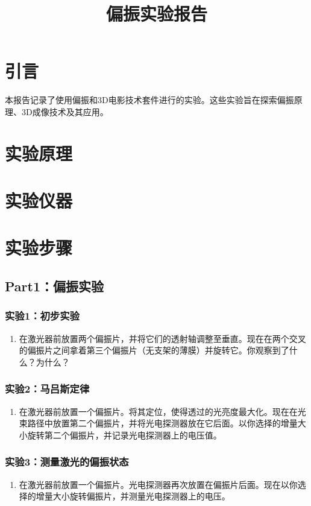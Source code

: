 \documentclass{ctexart}
\title{偏振实验报告}
\begin{document}
\maketitle

\section{引言}
本报告记录了使用偏振和3D电影技术套件进行的实验。这些实验旨在探索偏振原理、3D成像技术及其应用。
\section{实验原理}
\section{实验仪器}
\section{实验步骤}
\subsection{Part1：偏振实验}

\subsubsection{实验1：初步实验}
\begin{enumerate}
    \item 在激光器前放置两个偏振片，并将它们的透射轴调整至垂直。现在在两个交叉的偏振片之间拿着第三个偏振片（无支架的薄膜）并旋转它。你观察到了什么？为什么？
\end{enumerate}

\subsubsection{实验2：马吕斯定律}
\begin{enumerate}
    \item 在激光器前放置一个偏振片。将其定位，使得透过的光亮度最大化。现在在光束路径中放置第二个偏振片，并将光电探测器放在它后面。以你选择的增量大小旋转第二个偏振片，并记录光电探测器上的电压值。
\end{enumerate}

\subsubsection{实验3：测量激光的偏振状态}
\begin{enumerate}
    \item 在激光器前放置一个偏振片。光电探测器再次放置在偏振片后面。现在以你选择的增量大小旋转偏振片，并测量光电探测器上的电压。
\end{enumerate}
\end{document}
